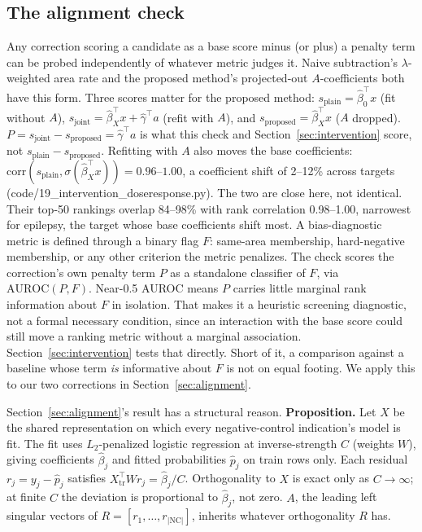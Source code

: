 \documentclass{llncs}
\begin{document}
\subsection{The alignment check}
\label{sec:alignment-check}
Any correction scoring a candidate as a base score minus (or plus) a penalty term can be probed independently of whatever metric judges it. Naive subtraction's $\lambda$-weighted area rate and the proposed method's projected-out $A$-coefficients both have this form. Three scores matter for the proposed method: $s_{\text{plain}}=\hat\beta_0^\top x$ (fit without $A$), $s_{\text{joint}}=\hat\beta_X^\top x+\hat\gamma^\top a$ (refit with $A$), and $s_{\text{proposed}}=\hat\beta_X^\top x$ ($A$ dropped). $P=s_{\text{joint}}-s_{\text{proposed}}=\hat\gamma^\top a$ is what this check and Section~\ref{sec:intervention} score, not $s_{\text{plain}}-s_{\text{proposed}}$. Refitting with $A$ also moves the base coefficients: $\mathrm{corr}(s_{\text{plain}},\sigma(\hat\beta_X^\top x))=0.96$--$1.00$, a coefficient shift of 2--12\% across targets (code/19\_intervention\_doseresponse.py). The two are close here, not identical. Their top-50 rankings overlap 84--98\% with rank correlation 0.98--1.00, narrowest for epilepsy, the target whose base coefficients shift most. A bias-diagnostic metric is defined through a binary flag $F$: same-area membership, hard-negative membership, or any other criterion the metric penalizes. The check scores the correction's own penalty term $P$ as a standalone classifier of $F$, via $\mathrm{AUROC}(P,F)$. Near-0.5 AUROC means $P$ carries little marginal rank information about $F$ in isolation. That makes it a heuristic screening diagnostic, not a formal necessary condition, since an interaction with the base score could still move a ranking metric without a marginal association. Section~\ref{sec:intervention} tests that directly. Short of it, a comparison against a baseline whose term \emph{is} informative about $F$ is not on equal footing. We apply this to our two corrections in Section~\ref{sec:alignment}.

Section~\ref{sec:alignment}'s result has a structural reason. \textbf{Proposition.} Let $X$ be the shared representation on which every negative-control indication's model is fit. The fit uses $L_2$-penalized logistic regression at inverse-strength $C$ (weights $W$), giving coefficients $\hat\beta_j$ and fitted probabilities $\hat p_j$ on train rows only. Each residual $r_j = y_j - \hat p_j$ satisfies $X_{\mathrm{tr}}^\top W r_j = \hat\beta_j / C$. Orthogonality to $X$ is exact only as $C \to \infty$; at finite $C$ the deviation is proportional to $\hat\beta_j$, not zero. $A$, the leading left singular vectors of $R=[r_1,\dots,r_{|\mathrm{NC}|}]$, inherits whatever orthogonality $R$ has.
\end{document}
